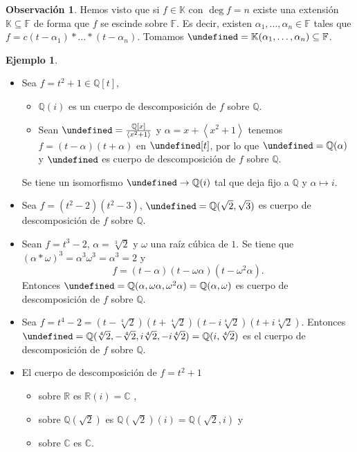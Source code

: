 \documentclass[10pt, spanish]{report}
\theoremstyle{definition}
\newtheorem*{ej}{Ejemplo}
\newtheorem*{obs}{Observación}
\newcommand{\Q}{\mathbb{Q}}
\newcommand{\R}{\mathbb{R}}
\newcommand{\C}{\mathbb{C}}
\newcommand{\F}{\mathbb{F}}
\newcommand{\K}{\mathbb{K}}
\let\L\undefined
\newcommand{\L}{\mathbb{L}}
\begin{document}
\begin{obs}
    Hemos visto que si $f\in\K$ con $\deg{f}=n$ existe una extensión
    $\K\subseteq\F$ de forma que $f$ se escinde sobre $\F$. Es decir, existen
    $\alpha_1,\ldots,\alpha_n\in \F$ tales que
    $f=c(t-\alpha_1)*\ldots*(t-\alpha_n)$. Tomamos
    $\L=\K(\alpha_1,\ldots,\alpha_n)\subseteq\F$.
\end{obs}

\begin{ej}\hspace{0pt}
    \begin{itemize}
        \item Sea $f=t^2+1\in\Q[t]$,
            \begin{itemize}
                \item $\Q(i)$ es un cuerpo de descomposición de $f$ sobre $\Q$.
                \item Sean $\L=\frac{\Q[x]}{\left<x^2+1\right>}$ y $\alpha=x+\left<
                    x^2+1\right>$ tenemos $f=(t-\alpha)(t+\alpha)$ en $\L[t]$, por lo
                    que $\L=\Q(\alpha)$ y $\L$ es cuerpo de descomposición de $f$ sobre
                    $\Q$.
            \end{itemize}
            Se tiene un isomorfismo $\L\to\Q(i)$ tal que deja fijo a $\Q$ y
            $\alpha\mapsto i$.
        \item Sea $f=(t^2-2)(t^2-3)$, $\L=\Q(\sqrt{2},\sqrt{3})$ es cuerpo de
            descomposición de $f$ sobre $\Q$.
        \item Sean $f=t^3-2$, $\alpha =\sqrt[3]{2}$ y $\omega$ una raíz cúbica
            de $1$. Se tiene que $(\alpha*\omega)^3=\alpha^3\omega^3=\alpha^3=2$
            y \[f=(t-\alpha)(t-\omega\alpha)(t-\omega^2\alpha).\] Entonces
            $\L=\Q(\alpha,\omega\alpha,\omega^2\alpha)=\Q(\alpha,\omega)$ es
            cuerpo de descomposición de $f$ sobre $\Q$.
        \item Sea $f=t^4-2=(t-\sqrt[4]{2})(t+\sqrt[4]{2})(t-i\sqrt[4]{2})
            (t+i\sqrt[4]{2})$. Entonces
            $\L=\Q(\sqrt[4]{2},-\sqrt[4]{2},i\sqrt[4]{2},-i\sqrt[4]{2})=\Q(i,\sqrt[4]{2})$
            es el cuerpo de descomposición de $f$ sobre $\Q$.
        \item El cuerpo de descomposición de $f=t^2+1$
            \begin{itemize}
                \item sobre $\R$ es $\R(i)=\C$ ,
                \item sobre $\Q(\sqrt{2})$ es $\Q(\sqrt{2})(i)=\Q(\sqrt{2},i)$ y
                \item sobre $\C$ es $\C$.
            \end{itemize}
    \end{itemize}
\end{ej}
\end{document}
